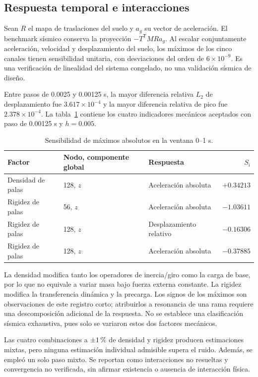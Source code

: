 \documentclass[11pt,a4paper]{article}
\begin{document}
\subsection{Respuesta temporal e interacciones}
Sean $R$ el mapa de traslaciones del suelo y $a_g$ su vector de aceleración. El benchmark sísmico conserva la proyección $-T^{\mathsf T}MRa_g$. Al escalar conjuntamente aceleración, velocidad y desplazamiento del suelo, los máximos de los cinco canales tienen sensibilidad unitaria, con desviaciones del orden de $6\times10^{-9}$. Es una verificación de linealidad del sistema congelado, no una validación sísmica de diseño.

Entre pasos de 0.0025 y 0.00125 s, la mayor diferencia relativa $L_2$ de desplazamiento fue $3.617\times10^{-4}$ y la mayor diferencia relativa de pico fue $2.378\times10^{-4}$. La tabla~\ref{tab:time} contiene los cuatro indicadores mecánicos aceptados con paso de 0.00125 s y $h=0.005$.

\begin{table}[htbp]
\centering\small
\caption{Sensibilidad de máximos absolutos en la ventana 0--1 s.}\label{tab:time}
\begin{tabular}{lllr}
\toprule
Factor & Nodo, componente global & Respuesta & $S_i$\\
\midrule
Densidad de palas & 128, $z$ & Aceleración absoluta & $+0.34213$\\
Rigidez de palas & 56, $z$ & Aceleración absoluta & $-1.03611$\\
Rigidez de palas & 128, $z$ & Desplazamiento relativo & $-0.16306$\\
Rigidez de palas & 128, $z$ & Aceleración absoluta & $-0.37885$\\
\bottomrule
\end{tabular}
\end{table}

La densidad modifica tanto los operadores de inercia/giro como la carga de base, por lo que no equivale a variar masa bajo fuerza externa constante. La rigidez modifica la transferencia dinámica y la precarga. Los signos de los máximos son observaciones de este registro corto; atribuirlos a resonancia de una rama requiere una descomposición adicional de la respuesta. No se establece una clasificación sísmica exhaustiva, pues solo se variaron estos dos factores mecánicos.

Las cuatro combinaciones a $\pm1\,\text{\char37}$ de densidad y rigidez producen estimaciones mixtas, pero ninguna estimación individual admisible supera el ruido. Además, se empleó un solo paso mixto. Se reportan como interacciones no resueltas y convergencia no verificada, sin afirmar existencia o ausencia de interacción física.
\end{document}
